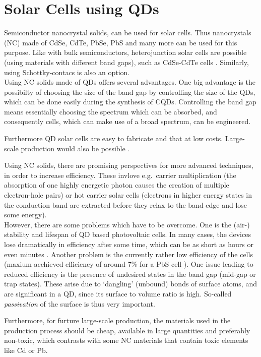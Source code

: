\section{Solar Cells using QDs}

Semiconductor nanocrystal solids, can be used for solar cells. Thus nanocrystals (NC) made of CdSe, CdTe, PbSe, PbS and many more can be used for this purpose. Like with bulk semiconductors, heterojunction solar cells are possible (using materials with different band gaps), such as CdSe-CdTe cells \cite[p.430]{Talapin}. Similarly, using Schottky-contacs is also an option.\\

Using NC solids made of QDs offers several advantages. One big advantage is the possibilty of choosing the size of the band gap by controlling the size of the QDs, which can be done easily during the synthesis of CQDs. Controlling the band gap means essentially choosing the spectrum which can be absorbed, and consequently cells, which can make use of a broad spectrum, can be engineered.

Furthermore QD solar cells are easy to fabricate and that at low costs. Large-scale production would also be possible \cite[p.447]{Talapin}.

Using NC solids, there are promising perspectives for more advanced techniques, in order to increase efficiency. These invlove e.g.~carrier multiplication (the absorption of one highly energetic photon causes the creation of multiple electron-hole pairs) or hot carrier solar cells (electrons in higher energy states in the conduction band are extracted before they relax to the band edge and lose some energy).\\

However, there are some problems which have to be overcome. One is the (air-) stability and lifespan of QD based photovoltaic cells. In many cases, the devices lose dramatically in efficiency after some time, which can be as short as hours or even minutes \cite[p.26]{Tang2011}. Another problem is the currently rather low efficiency of the cells (maxium acchieved efficiency of around 7\% for a PbS cell \cite[p.1]{Ip2012}). One issue leading to reduced efficiency is the presence of undesired states in the band gap (mid-gap or trap states). These arise due to `dangling' (unbound) bonds of surface atoms, and are significant in a QD, since its surface to volume ratio is high. So-called \textit{passivation} of the surface is thus very important. 

Furthermore, for furture large-scale production, the materials used in the production process should be cheap,  available in large quantities and preferably non-toxic, which contrasts with some NC materials that contain toxic elements like Cd or Pb.

